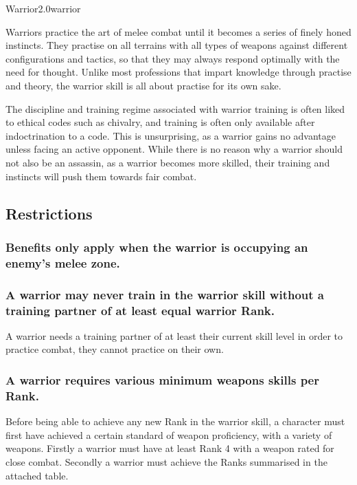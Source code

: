\begin{skill*}{Warrior}{2.0}{warrior}

Warriors practice the art of melee combat until it becomes a series of
finely honed instincts.  They practise on all terrains with all types
of weapons against different configurations and tactics, so that they
may always respond optimally with the need for thought.  Unlike most
professions that impart knowledge through practise and theory, the
warrior skill is all about practise for its own sake.

The discipline and training regime associated with warrior training is
often liked to ethical codes such as chivalry, and training is often
only available after indoctrination to a code.  This is unsurprising,
as a warrior gains no advantage unless facing an active opponent.
While there is no reason why a warrior should not also be an assassin,
as a warrior becomes more skilled, their training and instincts will
push them towards fair combat.

\subsection{Restrictions}

\subsubsection{Benefits only apply when the warrior is occupying an
enemy's melee zone.}

\subsubsection{A warrior may never train in the warrior skill without a
training partner of at least equal warrior Rank.}

A warrior needs a training partner of at least their current skill
level in order to practice combat, they cannot practice on their own.

\subsubsection{A warrior requires various minimum weapons skills per Rank.}

Before being able to achieve any new Rank in the warrior skill, a
character must first have achieved a certain standard of weapon
proficiency, with a variety of weapons.  Firstly a warrior must have
at least Rank 4 with a weapon rated for close combat.  Secondly a
warrior must achieve the Ranks summarised in the attached table.


\end{skill*}
